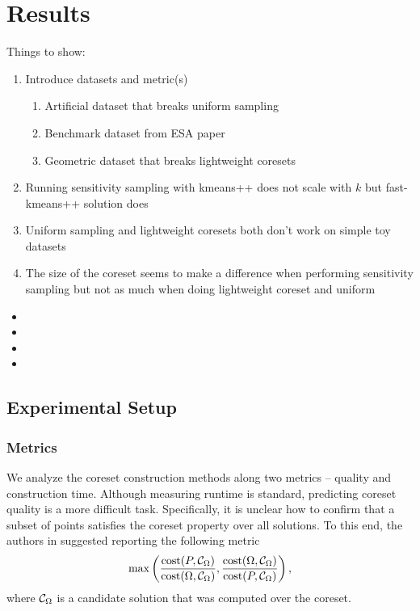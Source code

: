 \section{Results}
Things to show:
\begin{enumerate}
    \item Introduce datasets and metric(s)
    \begin{enumerate}
        \item Artificial dataset that breaks uniform sampling
        \item Benchmark dataset from ESA paper
        \item Geometric dataset that breaks lightweight coresets
    \end{enumerate}
    \item Running sensitivity sampling with kmeans++ does not scale with $k$ but fast-kmeans++ solution does
    \item Uniform sampling and lightweight coresets both don't work on simple toy datasets
    \item The size of the coreset seems to make a difference when performing sensitivity sampling but not as much
          when doing lightweight coreset and uniform
\end{enumerate}

\begin{itemize}
\item {}
\item {}
\item {}
\item {}
\end{itemize}


\subsection{Experimental Setup}
\subsubsection{Metrics}

We analyze the coreset construction methods along two metrics -- quality and construction time.  Although measuring runtime is standard, predicting coreset
quality is a more difficult task. Specifically, it is unclear how to confirm that a subset of points satisfies the coreset property over all solutions. To this
end, the authors in \cite{chrisESA} suggested reporting the following metric 
\[ \max \left( \dfrac{\operatorname{cost}(P, \mathcal C_{\Omega})}{\operatorname{cost}(\Omega, \mathcal C_{\Omega})}, \dfrac{\operatorname{cost}(\Omega, \mathcal C_{\Omega})}{\operatorname{cost}(P, \mathcal C_{\Omega})} \right),\]
where $\mathcal C_{\Omega}$ is a candidate solution that was computed over the coreset.

